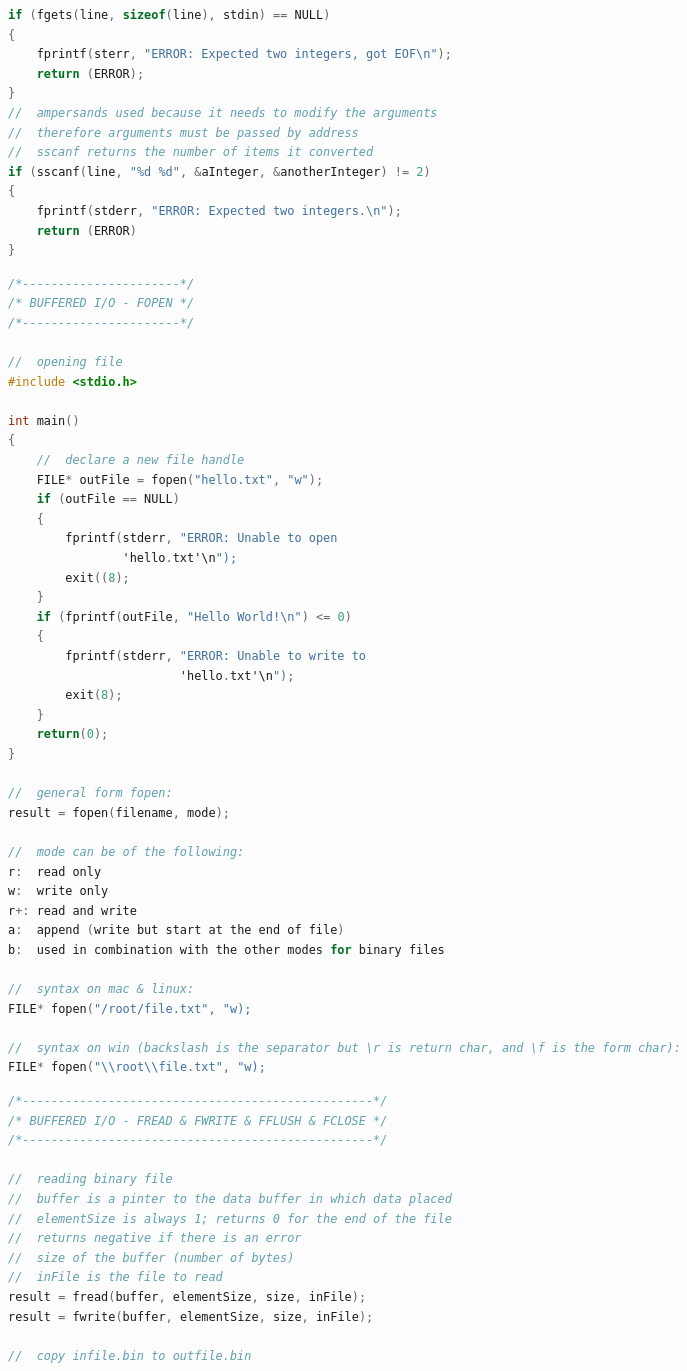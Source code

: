 \documentclass[8pt]{extarticle}
\begin{document}
\begin{small}
\begin{multicols}{2}
\begin{lstlisting}[language=C]
if (fgets(line, sizeof(line), stdin) == NULL)
{
	fprintf(sterr, "ERROR: Expected two integers, got EOF\n");
	return (ERROR);
}
//  ampersands used because it needs to modify the arguments 
//  therefore arguments must be passed by address
//  sscanf returns the number of items it converted
if (sscanf(line, "%d %d", &aInteger, &anotherInteger) != 2)
{
	fprintf(stderr, "ERROR: Expected two integers.\n");
	return (ERROR)
}
\end{lstlisting}

\begin{lstlisting}[language=C]
/*----------------------*/
/* BUFFERED I/O - FOPEN */
/*----------------------*/

//  opening file
#include <stdio.h>

int main()
{
	//  declare a new file handle
	FILE* outFile = fopen("hello.txt", "w");
	if (outFile == NULL)
	{
		fprintf(stderr, "ERROR: Unable to open 
				'hello.txt'\n");
		exit((8);
	}
	if (fprintf(outFile, "Hello World!\n") <= 0)
	{
		fprintf(stderr, "ERROR: Unable to write to 
						'hello.txt'\n");
		exit(8);
	}
	return(0);
}

//  general form fopen:
result = fopen(filename, mode);

//  mode can be of the following:
r:	read only
w:	write only
r+:	read and write
a:	append (write but start at the end of file)
b:	used in combination with the other modes for binary files

//  syntax on mac & linux:
FILE* fopen("/root/file.txt", "w);

//  syntax on win (backslash is the separator but \r is return char, and \f is the form char):
FILE* fopen("\\root\\file.txt", "w);
\end{lstlisting}


\begin{lstlisting}[language=C]
/*-------------------------------------------------*/
/* BUFFERED I/O - FREAD & FWRITE & FFLUSH & FCLOSE */
/*-------------------------------------------------*/

//  reading binary file
//  buffer is a pinter to the data buffer in which data placed
//  elementSize is always 1; returns 0 for the end of the file
//  returns negative if there is an error
//  size of the buffer (number of bytes)
//  inFile is the file to read
result = fread(buffer, elementSize, size, inFile);
result = fwrite(buffer, elementSize, size, inFile);

//  copy infile.bin to outfile.bin


\end{lstlisting}
\end{multicols}
\end{small}
\end{document}

